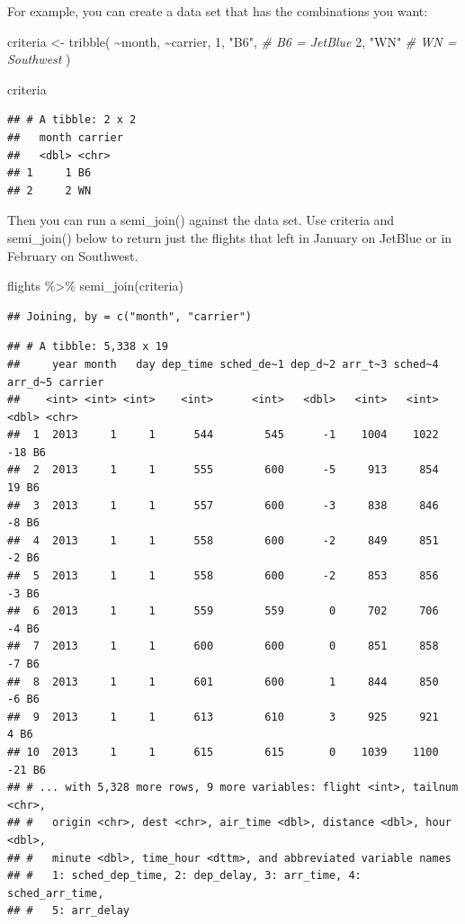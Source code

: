 \documentclass[
]{article}
\newenvironment{Shaded}{\begin{snugshade}}{\end{snugshade}}
\newcommand{\CommentTok}[1]{\textcolor[rgb]{0.56,0.35,0.01}{\textit{#1}}}
\newcommand{\DecValTok}[1]{\textcolor[rgb]{0.00,0.00,0.81}{#1}}
\newcommand{\FunctionTok}[1]{\textcolor[rgb]{0.00,0.00,0.00}{#1}}
\newcommand{\NormalTok}[1]{#1}
\newcommand{\OtherTok}[1]{\textcolor[rgb]{0.56,0.35,0.01}{#1}}
\newcommand{\SpecialCharTok}[1]{\textcolor[rgb]{0.00,0.00,0.00}{#1}}
\newcommand{\StringTok}[1]{\textcolor[rgb]{0.31,0.60,0.02}{#1}}
\begin{document}
For example, you can create a data set that has the combinations you
want:

\begin{Shaded}
\begin{Highlighting}[]
\NormalTok{criteria }\OtherTok{\textless{}{-}} \FunctionTok{tribble}\NormalTok{(}
  \SpecialCharTok{\textasciitilde{}}\NormalTok{month, }\SpecialCharTok{\textasciitilde{}}\NormalTok{carrier,}
       \DecValTok{1}\NormalTok{,     }\StringTok{"B6"}\NormalTok{, }\CommentTok{\# B6 = JetBlue}
       \DecValTok{2}\NormalTok{,     }\StringTok{"WN"}  \CommentTok{\# WN = Southwest}
\NormalTok{)}

\NormalTok{criteria}
\end{Highlighting}
\end{Shaded}

\begin{verbatim}
## # A tibble: 2 x 2
##   month carrier
##   <dbl> <chr>  
## 1     1 B6     
## 2     2 WN
\end{verbatim}

Then you can run a semi\_join() against the data set. Use criteria and
semi\_join() below to return just the flights that left in January on
JetBlue or in February on Southwest.

\begin{Shaded}
\begin{Highlighting}[]
\NormalTok{flights }\SpecialCharTok{\%\textgreater{}\%}
  \FunctionTok{semi\_join}\NormalTok{(criteria)}
\end{Highlighting}
\end{Shaded}

\begin{verbatim}
## Joining, by = c("month", "carrier")
\end{verbatim}

\begin{verbatim}
## # A tibble: 5,338 x 19
##     year month   day dep_time sched_de~1 dep_d~2 arr_t~3 sched~4 arr_d~5 carrier
##    <int> <int> <int>    <int>      <int>   <dbl>   <int>   <int>   <dbl> <chr>  
##  1  2013     1     1      544        545      -1    1004    1022     -18 B6     
##  2  2013     1     1      555        600      -5     913     854      19 B6     
##  3  2013     1     1      557        600      -3     838     846      -8 B6     
##  4  2013     1     1      558        600      -2     849     851      -2 B6     
##  5  2013     1     1      558        600      -2     853     856      -3 B6     
##  6  2013     1     1      559        559       0     702     706      -4 B6     
##  7  2013     1     1      600        600       0     851     858      -7 B6     
##  8  2013     1     1      601        600       1     844     850      -6 B6     
##  9  2013     1     1      613        610       3     925     921       4 B6     
## 10  2013     1     1      615        615       0    1039    1100     -21 B6     
## # ... with 5,328 more rows, 9 more variables: flight <int>, tailnum <chr>,
## #   origin <chr>, dest <chr>, air_time <dbl>, distance <dbl>, hour <dbl>,
## #   minute <dbl>, time_hour <dttm>, and abbreviated variable names
## #   1: sched_dep_time, 2: dep_delay, 3: arr_time, 4: sched_arr_time,
## #   5: arr_delay
\end{verbatim}
\end{document}
